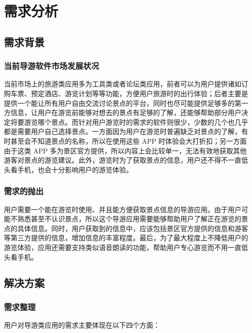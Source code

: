\chapter{需求分析}

	\section{需求背景}

		\subsection{当前导游软件市场发展状况}

			当前市场上的旅游类应用多为工具类或者论坛类应用，前者可以为用户提供诸如订购车票、预定酒店、游览计划等等功能，方便用户旅游时的出行体验；后者主要是提供一个能让所有用户自由交流讨论景点的平台，同时也尽可能提供足够多的第一方信息，让用户在游览前能够对想去的景点有足够的了解，还能够帮助部分用户决定将要游览哪个景点。而针对用户游览时的需求的软件则很少，少数的几个也几乎都是需要用户自己选择景点。一方面因为用户在游览时普遍缺乏对景点的了解，有时甚至会不知道景点的名称，所以在使用这些 APP 时体验会大打折扣；另一方面由于这类 APP 多为景区官方提供，所以内容上会比较单一，无法有效地获取其他游客对景点的游览建议。此外，游览时为了获取景点的信息，用户还不得不一直低头看手机，也会十分影响用户的游览体验。

		\subsection{需求的抛出}

			用户需要一个能在游览时使用、并且能方便获取景点信息的导游应用。由于用户可能不熟悉甚至不认识景点，所以这个导游应用需要能够帮助用户了解正在游览的景点的具体信息。同时，用户获取到的信息中，应该包括景区官方提供的信息和游客等第三方提供的信息，增加信息的丰富程度。最后，为了最大程度上不降低用户的游览体验，应用还需要支持类似语音朗读的功能，帮助用户专心游览而不用一直低头看手机。

	\section{解决方案}

		\subsection{需求整理}

			用户对导游类应用的需求主要体现在以下四个方面：


